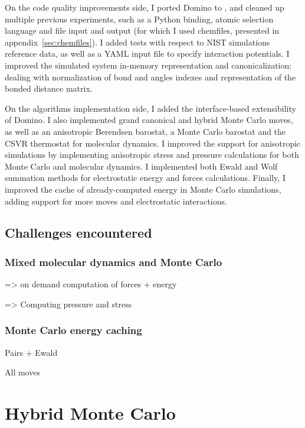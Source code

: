 \documentclass[thesis]{subfiles}
\begin{document}
On the code quality improvements side, I ported Domino to , and cleaned up
multiple previous experiments, such as a Python binding, atomic selection
language and file input and output (for which I used chemfiles, presented in
appendix~\ref{sec:chemfiles}). I added tests with respect to NIST simulations
reference data\cite{NIST}, as well as a YAML input file to specify interaction
potentials. I improved the simulated system in-memory representation and
canonicalization: dealing with normalization of bond and angles indexes and
representation of the bonded distance matrix.

On the algorithms implementation side, I added the interface-based extensibility
of Domino. I also implemented grand canonical and hybrid Monte Carlo moves, as
well as an anisotropic Berendsen barostat, a Monte Carlo barostat and the CSVR
thermostat for molecular dynamics. I improved the support for anisotropic
simulations by implementing anisotropic stress and pressure calculations for
both Monte Carlo and molecular dynamics. I implemented both Ewald and Wolf
summation methods for electrostatic energy and forces calculations. Finally, I
improved the cache of already-computed energy in Monte Carlo simulations, adding
support for more moves and electrostatic interactions.

\subsection{Challenges encountered}

\subsubsection{Mixed molecular dynamics and Monte Carlo}

=> on demand computation of forces + energy

=> Computing pressure and stress

\subsubsection{Monte Carlo energy caching}

Pairs + Ewald

All moves


\newpage
\section{Hybrid Monte Carlo}
\label{sec:hmc}
\end{document}
